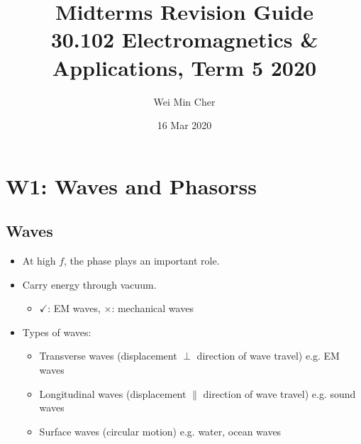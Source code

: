 \documentclass[a4paper]{article}
\begin{document}
\title{Midterms Revision Guide\\[0.1cm]
    \large 30.102 Electromagnetics \& Applications, Term 5 2020}
\author{Wei Min Cher}
\date{16 Mar 2020}

\maketitle

\tableofcontents

\newpage

\section{W1: Waves and Phasorss}
\subsection{Waves}
\begin{itemize}
    \item At high $f$, the phase plays an important role.
    \item Carry energy through vacuum.
    \begin{itemize}[label=$\circ$]
        \item $\checkmark$: EM waves, $\times$: mechanical waves
    \end{itemize}
    \item Types of waves:
    \begin{itemize}[label=$\circ$]
        \item Transverse waves (displacement $\perp$ direction of wave travel) \quad e.g. EM waves
        \item Longitudinal waves (displacement $\parallel$ direction of wave travel) \quad e.g. sound waves
        \item Surface waves (circular motion) \quad e.g. water, ocean waves
    \end{itemize}
\end{itemize}
\end{document}
